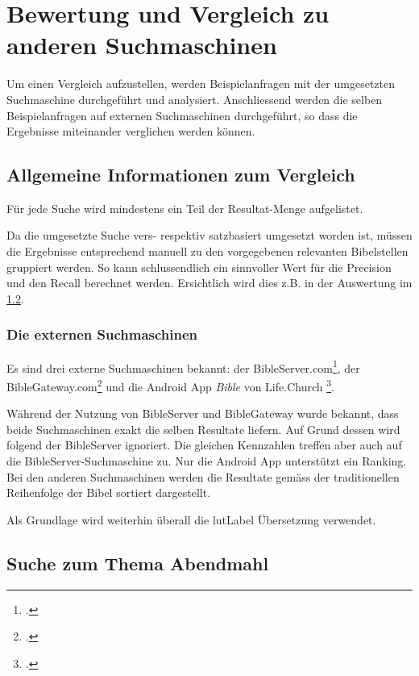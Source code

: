 \chapter{Bewertung und Vergleich zu anderen Suchmaschinen}
 \label{sec:compareSearches}
Um einen Vergleich aufzustellen, werden Beispielanfragen mit der umgesetzten Suchmaschine durchgeführt und analysiert.
Anschliessend werden die selben Beispielanfragen auf externen Suchmaschinen durchgeführt, so dass die Ergebnisse miteinander verglichen werden können.

\section{Allgemeine Informationen zum Vergleich}
Für jede Suche wird mindestens ein Teil der Resultat-Menge aufgelistet.

Da die umgesetzte Suche vers- respektiv satzbasiert umgesetzt worden ist, müssen die Ergebnisse entsprechend manuell zu den vorgegebenen relevanten Bibelstellen gruppiert werden.
So kann schlussendlich ein sinnvoller Wert für die Precision und den Recall berechnet werden.
Ersichtlich wird dies z.B. in der Auswertung im \cref{sec:index_abendmahl}.


\subsection{Die externen Suchmaschinen}
Es sind drei externe Suchmaschinen bekannt: der BibleServer.com\footcite{BibleServer_Die_Bibel_fr_alle_2016-05-30}, der BibleGateway.com\footcite{BibleGateway_2016-05-30} und die Android App \textit{Bible} von Life.Church \footcite{Bible_Android_Apps_on_Google_Play_2016-05-30}.

Während der Nutzung von BibleServer und BibleGateway wurde bekannt, dass beide Suchmaschinen exakt die selben Resultate liefern.
Auf Grund dessen wird folgend der BibleServer ignoriert. Die gleichen Kennzahlen treffen aber auch auf die BibleServer-Suchmaschine zu.
Nur die Android App unterstützt ein Ranking. Bei den anderen Suchmaschinen werden die Resultate gemäss der traditionellen Reihenfolge der Bibel sortiert dargestellt.

Als Grundlage wird weiterhin überall die \gls{lutLabel} Übersetzung verwendet.



\newpage
\section{Suche zum Thema Abendmahl}
\label{sec:index_abendmahl}

